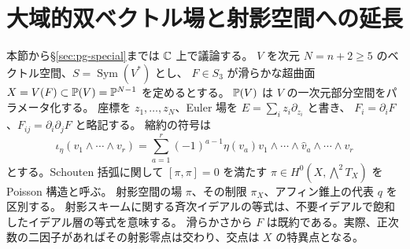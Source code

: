 \section{大域的双ベクトル場と射影空間への延長}\label{sec:pg-extension}
本節から\S\ref{sec:pg-special}までは $\mathbb C$ 上で議論する。
$V$ を次元 $N=n+2\geq5$ のベクトル空間、$S=\operatorname{Sym}(V^*)$ とし、
$F\in S_3$ が滑らかな超曲面 $X=V(F)\subset\mathbb P(V)=\mathbb P^{N-1}$ を定めるとする。
$\mathbb P(V)$ は $V$ の一次元部分空間をパラメータ化する。
座標を $z_1,\ldots,z_N$、Euler 場を $E=\sum_i z_i\partial_{z_i}$ と書き、
$F_i=\partial_iF$、$F_{ij}=\partial_i\partial_jF$ と略記する。
縮約の符号は
\[
\iota_\eta(v_1\wedge\cdots\wedge v_r)
 =\sum_{a=1}^r(-1)^{a-1}\eta(v_a)
 v_1\wedge\cdots\wedge\widehat v_a\wedge\cdots\wedge v_r
\]
とする。Schouten 括弧に関して $[\pi,\pi]=0$ を満たす
$\pi\in H^0(X,\bigwedge^2T_X)$ を Poisson 構造と呼ぶ。
射影空間の場 $\pi$、その制限 $\pi_X$、アフィン錐上の代表 $q$ を区別する。
射影スキームに関する斉次イデアルの等式は、不要イデアルで飽和したイデアル層の等式を意味する。
滑らかさから $F$ は既約である。実際、正次数の二因子があればその射影零点は交わり、交点は $X$ の特異点となる。

